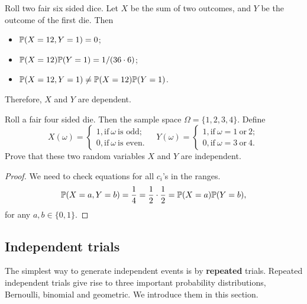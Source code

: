 \begin{example}
  Roll two fair six sided dice. Let $X$ be the sum of two outcomes, and $Y$ be
  the outcome of the first die. Then
  \begin{itemize}
  \item $\mathbb{P}(X = 12, Y = 1) = 0$;
  \item $\mathbb{P}(X = 12)\mathbb{P}(Y = 1) = 1/(36\cdot 6)$;
  \item $\mathbb{P}(X = 12, Y = 1) \neq \mathbb{P}(X = 12)\mathbb{P}(Y = 1)$.
  \end{itemize}
  Therefore, $X$ and $Y$ are dependent. 
\end{example}
\begin{example}
  Roll a fair four sided die. Then the sample space $\Omega = \{1,2,3,4\}$.
  Define
  \[
    X(\omega) =
    \begin{cases}
      1,\mbox{if}~\omega~\text{is odd};\\
      0,\mbox{if}~\omega~\text{is even}.
    \end{cases}
    \quad
    Y(\omega) =
    \begin{cases}
      1,\mbox{if}~\omega = 1~\text{or}~2;\\
      0,\mbox{if}~\omega = 3~\text{or}~4.
    \end{cases}
  \]
  Prove that these two random variables $X$ and $Y$ are independent.
\end{example}
\begin{proof}
  We need to check equations for all $c_i$'s in the ranges.
  \[
    \mathbb{P}(X = a, Y = b) = \frac{1}{4} = \frac{1}{2}\cdot \frac{1}{2}=\mathbb{P}(X = a)\mathbb{P}(Y = b),
  \]
  for any $a, b \in \{0,1\}$.
\end{proof}


\subsection{Independent trials}
\label{subsec:indep-trials}
The simplest way to generate independent events is by \textbf{repeated} trials.
Repeated independent trials give rise to three important probability
distributions, Bernoulli, binomial and geometric. We introduce them in this
section.

